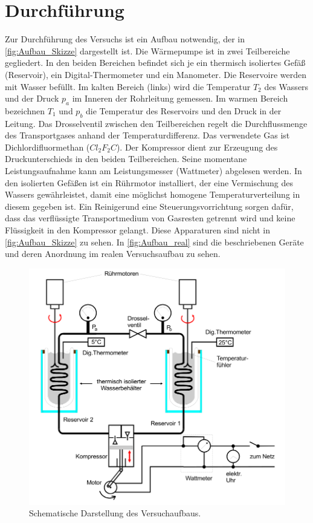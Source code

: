 \section{Durchführung}
\label{sec:Durchführung}
Zur Durchführung des Versuchs ist ein Aufbau notwendig, der in \autoref{fig:Aufbau_Skizze} dargestellt ist.
Die Wärmepumpe ist in zwei Teilbereiche gegliedert. In den beiden Bereichen befindet sich je ein thermisch isoliertes Gefäß (Reservoir), ein Digital-Thermometer und 
ein Manometer. Die Reservoire werden mit Wasser befüllt. Im \dq kalten\dq\: Bereich (links) wird die Temperatur $T_2$ des Wassers und der Druck $p_a$ im Inneren der Rohrleitung 
gemessen. Im \dq warmen\dq\: Bereich bezeichnen $T_1$ und $p_b$ die Temperatur des Reservoirs und den Druck in der Leitung. Das Drosselventil zwischen den Teilbereichen regelt 
die Durchflussmenge des Transportgases anhand der Temperaturdifferenz. Das verwendete Gas ist Dichlordifluormethan ($Cl_2F_2C$). Der Kompressor dient zur Erzeugung des 
Druckunterschieds in den beiden Teilbereichen. Seine momentane Leistungsaufnahme kann am Leistungsmesser (Wattmeter) abgelesen werden. In den isolierten Gefäßen ist ein Rührmotor 
installiert, der eine Vermischung des Wassers gewährleistet, damit eine möglichst homogene Temperaturverteilung in diesem gegeben ist. Ein \dq Reiniger\dq und eine 
Steuerungsvorrichtung sorgen dafür, dass das verflüssigte Transportmedium von Gasresten getrennt wird und keine Flüssigkeit in den Kompressor gelangt. Diese Apparaturen sind 
nicht in \autoref{fig:Aufbau_Skizze} zu sehen. In \autoref{fig:Aufbau_real} sind die beschriebenen Geräte und deren Anordnung im realen Versuchsaufbau zu sehen.

\begin{figure}
    \centering
    \caption{Schematische Darstellung des Versuchaufbaus. \cite{v206}}
    \label{fig:Aufbau_Skizze}
    \includegraphics[width=.5\textwidth]{content/Aufbau_Skizze.png}
\end{figure}

